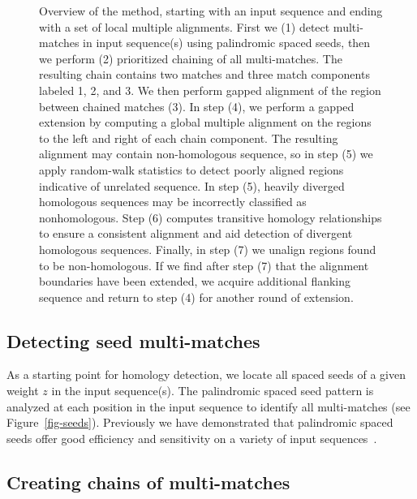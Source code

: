 \documentclass[twoside,11pt]{article}
\begin{document}
\begin{figure}
\begin{center}
\end{center}
\caption{Overview of the method, starting with an input sequence and ending with a set of local multiple alignments. First we (1) detect multi-matches in input sequence(s) using palindromic spaced seeds, then we perform (2) prioritized chaining of all multi-matches.  The resulting chain contains two matches and three match components labeled 1, 2, and 3.  We then perform gapped alignment of the region between chained matches (3).   In step (4), we perform a gapped extension by computing a global multiple alignment on the regions to the left and right of each chain component.  The resulting alignment may contain non-homologous sequence, so in step (5) we apply random-walk statistics to detect poorly aligned regions indicative of unrelated sequence.  In step (5), heavily diverged homologous sequences may be incorrectly classified as nonhomologous.  Step (6) computes transitive homology relationships to ensure a consistent alignment and aid detection of divergent homologous sequences.  Finally, in step (7) we unalign regions found to be non-homologous.  If we find after step (7) that the alignment boundaries have been extended, we acquire additional flanking sequence and return to step (4) for another round of extension.}
\label{fig-main}
\end{figure}



\subsection{Detecting seed multi-matches}

As a starting point for homology detection, we locate all spaced seeds of a given weight $z$ in the input sequence(s). The palindromic spaced seed pattern is analyzed at each position in the input sequence to identify all multi-matches (see Figure~\ref{fig-seeds}).  Previously we have demonstrated that palindromic spaced seeds offer good efficiency and sensitivity on a variety of input sequences~\cite{ref-procrast}.

\subsection{Creating chains of multi-matches}
\end{document}
